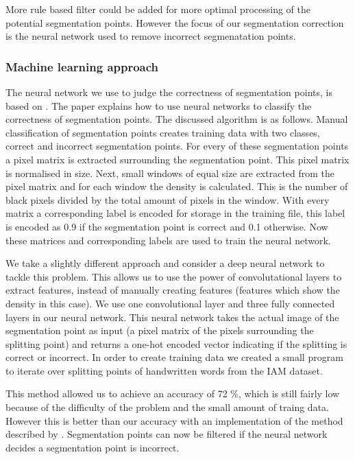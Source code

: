 \documentclass{article}
\begin{document}
More rule based filter could be added for more optimal processing of the potential segmentation points.
However the focus of our segmentation correction is the neural network used to remove incorrect segmenatation points.


\subsubsection{Machine learning approach}
The neural network we use to judge the correctness of segmentation points, is based on \cite{evalsplitpointsnn}. The paper explains how to use neural networks to classify the correctness of segmentation points. The discussed algorithm is as follows. Manual classification of segmentation points creates training data with two classes, correct and incorrect segmentation points.
For every of these segmentation points a pixel matrix is extracted surrounding the segmentation point. This pixel matrix is normalised in size.
Next, small windows of equal size are extracted from the pixel matrix and for each window the density is calculated. This is the number of black pixels divided by the total amount of pixels in the window.
With every matrix a corresponding label is encoded for storage in the training file, this label is encoded as 0.9 if the segmentation point is correct and 0.1 otherwise. Now these matrices and corresponding labels are used to train the neural network.

We take a slightly different approach and consider a deep neural network to tackle this problem. This allows us to use the power of convolutational layers to extract features, instead of manually creating features (features which show the density in this case).
We use one convolutional layer and three fully connected layers in our neural network. This neural network takes the actual image of the segmentation point as input (a pixel matrix of the pixels surrounding the splitting point) and returns a one-hot encoded vector indicating if the splitting is correct or incorrect. In order to create training data we created a small program to iterate over splitting points of handwritten words from the IAM dataset. \cite{iam}

This method allowed us to achieve an accuracy of 72 \%, which is still fairly low because of the difficulty of the problem and the small amount of traing data. However this is better than our accuracy with an implementation of the method described by \cite{evalsplitpointsnn}.
Segmentation points can now be filtered if the neural network decides a segmentation point is incorrect.
\end{document}
